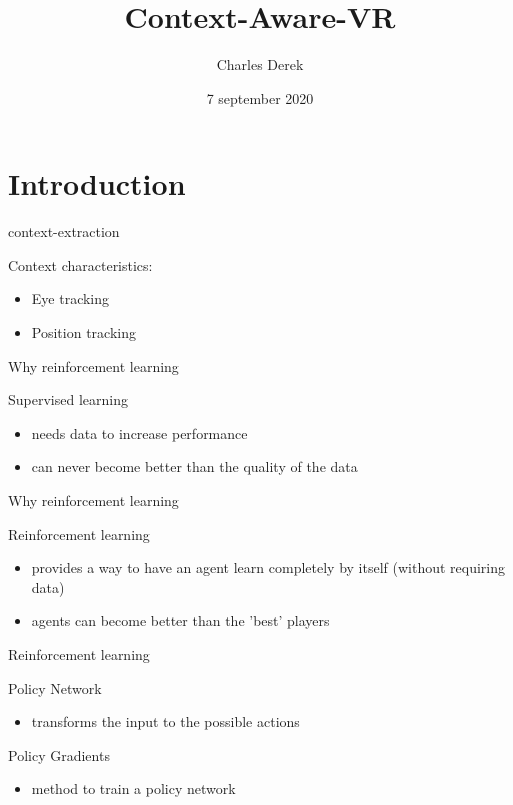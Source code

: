 \documentclass{beamer}
\title[Your Short Title]{Context-Aware-VR}
\author{Charles Derek}
\institute{University of Antwerp}
\date{7 september 2020}
\begin{document}
\begin{frame}
  \titlepage
\end{frame}


\section{Introduction}

\begin{frame}{context-extraction}


Context characteristics: 

\begin{itemize}
	\item Eye tracking
	\item Position tracking
\end{itemize}

\end{frame}


\begin{frame}{Why reinforcement learning}


Supervised learning 

\begin{itemize}
	\item needs data to increase performance
	\item can never become better than the quality of the data
\end{itemize}

\end{frame}


\begin{frame}{Why reinforcement learning}

Reinforcement learning 

\begin{itemize}
	\item provides a way to have an agent learn completely by itself (without requiring data) 
	\item agents can become better than the 'best' players
\end{itemize}

\end{frame}


\begin{frame}{Reinforcement learning}

Policy Network
\begin{itemize}
	\item transforms the input to the possible actions 
\end{itemize}

Policy Gradients
\begin{itemize}
	\item method to train a policy network
\end{itemize}

\end{frame}
\end{document}

